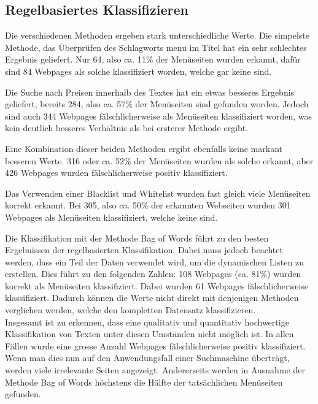 \subsection{Regelbasiertes Klassifizieren}
Die verschiedenen Methoden ergeben stark unterschiedliche Werte.
Die simpelste Methode, das Überprüfen des Schlagworts \glqq menu\grqq{} im Titel hat ein sehr schlechtes Ergebnis geliefert. 
Nur 64, also ca. 11\% der Menüseiten wurden erkannt, dafür sind 84 Webpages als solche klassifiziert worden, welche gar keine sind.

Die Suche nach Preisen innerhalb des Textes hat ein etwas besseres Ergebnis geliefert, bereits 284, also ca. 57\% der Menüseiten sind gefunden worden. 
Jedoch sind auch 344 Webpages fälschlicherweise als Menüseiten klassifiziert worden, was kein deutlich besseres Verhältnis als bei ersterer Methode ergibt.

Eine Kombination dieser beiden Methoden ergibt ebenfalls keine markant besseren Werte.
316 oder ca. 52\% der Menüseiten wurden als solche erkannt, aber 426 Webpages wurden fälschlicherweise positiv klassifiziert.

Das Verwenden einer Blacklist und Whitelist wurden fast gleich viele Menüseiten korrekt erkannt. Bei 305, also ca. 50\% der erkannten Webseiten wurden 301  Webpages als Menüseiten klassifiziert, welche keine sind.

Die Klassifikation mit der Methode \glqq Bag of Words\grqq{} führt zu den besten Ergebnissen der regelbasierten Klassifikation.
Dabei muss jedoch beachtet werden, dass ein Teil der Daten verwendet wird, um die dynamischen Listen zu erstellen.
Dies führt zu den folgenden Zahlen: 108 Webpages (ca. 81\%) wurden korrekt als Menüseiten klassifiziert.
Dabei wurden 61 Webpages fälschlicherweise klassifiziert.
Dadurch können die Werte nicht direkt mit denjenigen Methoden verglichen werden, welche den kompletten Datensatz klassifizieren. \\

Insgesamt ist zu erkennen, dass eine qualitativ und quantitativ hochwertige Klassifikation von Texten unter diesen Umständen nicht möglich ist.
In allen Fällen wurde eine grosse Anzahl Webpages fälschlicherweise positiv klassifiziert.
Wenn man dies nun auf den Anwendungsfall einer Suchmaschine überträgt, werden viele irrelevante Seiten angezeigt.
Andererseits werden in Ausnahme der Methode \glqq Bag of Words\grqq{} höchstens die Hälfte der tatsächlichen Menüseiten gefunden.

